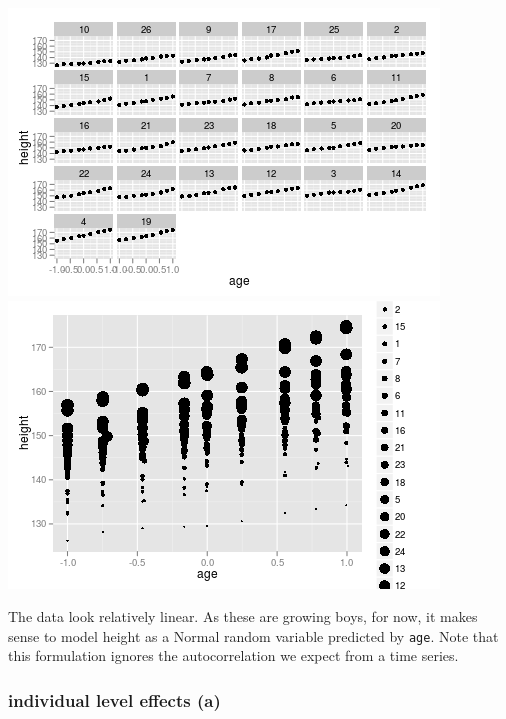 \documentclass{article}
\makeatletter
\newenvironment{kframe}{%
 \def\FrameCommand##1{\hskip\@totalleftmargin \hskip-\fboxsep
 \colorbox{shadecolor}{##1}\hskip-\fboxsep
     \hskip-\linewidth \hskip-\@totalleftmargin \hskip\columnwidth}%
 \MakeFramed {\advance\hsize-\width
   \@totalleftmargin\z@ \linewidth\hsize
   \@setminipage}}%
 {\par\unskip\endMakeFramed}
\newenvironment{knitrout}{}{} %
\makeatother
\begin{document}
\begin{knitrout}
{\begin{kframe}
\centering{}\includegraphics{plot-ox1} \includegraphics{plot-ox2} 

\end{kframe}}
\end{knitrout}


The data look relatively linear. As these are growing boys, for now, it makes sense to model height as a Normal random variable predicted by {\tt age}. 
Note that this formulation ignores the autocorrelation we expect from a time series.

\subsubsection*{individual level effects (a)}
\end{document}

